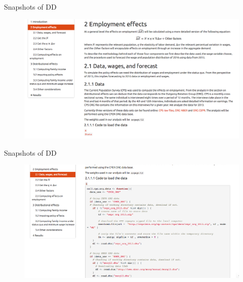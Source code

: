 \documentclass{beamer}
\begin{document}
\begin{frame}[plain]{Snapshots of DD\hyperlink{demo}{\beamerbutton{}}}
\vspace{-2em}
\begin{figure}[h!]
\centering
\hspace{-5em} \includegraphics[scale = 0.28]{../Images/Screen_Shot2}
\hyperlink{demo}{\beamerbutton{}}
\end{figure}	
\end{frame}

\begin{frame}[plain]{Snapshots of DD\hyperlink{demo}{\beamerbutton{}}}
\vspace{-2em}
\begin{figure}[h!]
\centering
\hspace{-5em} \includegraphics[scale = 0.28]{../Images/Screen_Shot3}
\hyperlink{demo}{\beamerbutton{}}
\end{figure}	
\end{frame}
\end{document}
